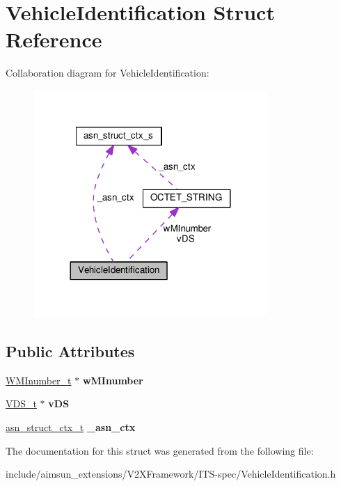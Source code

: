 \hypertarget{structVehicleIdentification}{}\section{Vehicle\+Identification Struct Reference}
\label{structVehicleIdentification}


Collaboration diagram for Vehicle\+Identification\+:\nopagebreak
\begin{figure}[H]
\begin{center}
\leavevmode
\includegraphics[width=252pt]{structVehicleIdentification__coll__graph}
\end{center}
\end{figure}
\subsection*{Public Attributes}
\begin{DoxyCompactItemize}
\item 
\hyperlink{structOCTET__STRING}{W\+M\+Inumber\+\_\+t} $\ast$ {\bfseries w\+M\+Inumber}\hypertarget{structVehicleIdentification_afcf359ff7e100193c076f171c8683628}{}\label{structVehicleIdentification_afcf359ff7e100193c076f171c8683628}

\item 
\hyperlink{structOCTET__STRING}{V\+D\+S\+\_\+t} $\ast$ {\bfseries v\+DS}\hypertarget{structVehicleIdentification_ab44712fabfd9e1f4c566c0dcdf9efaae}{}\label{structVehicleIdentification_ab44712fabfd9e1f4c566c0dcdf9efaae}

\item 
\hyperlink{structasn__struct__ctx__s}{asn\+\_\+struct\+\_\+ctx\+\_\+t} {\bfseries \+\_\+asn\+\_\+ctx}\hypertarget{structVehicleIdentification_a565ecd70a21c1da25857524da264f031}{}\label{structVehicleIdentification_a565ecd70a21c1da25857524da264f031}

\end{DoxyCompactItemize}


The documentation for this struct was generated from the following file\+:\begin{DoxyCompactItemize}
\item 
include/aimsun\+\_\+extensions/\+V2\+X\+Framework/\+I\+T\+S-\/spec/Vehicle\+Identification.\+h\end{DoxyCompactItemize}
